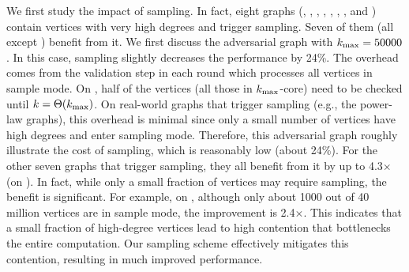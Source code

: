 We first study the impact of sampling. 
In fact, eight graphs (\TW{}, \EH{}, \SD{}, \CW{}, \HL{}, \HLs{}, \HPL{}, and \HCNS{}) contain vertices with very high degrees and trigger sampling. 
Seven of them (all except \HCNS{}) benefit from it. 
We first discuss the adversarial graph \HCNS{} with $k_{\max}=50000$. 
In this case, sampling slightly decreases the performance by 24\%. 
The overhead comes from the validation step in each round which processes all vertices in sample mode. 
On \HCNS{}, half of the vertices (all those in $k_{\max}$-core) need to be checked until $k=\Theta(k_{\max})$.  
On real-world graphs that trigger sampling (e.g., the power-law graphs), 
this overhead is minimal since only a small number of vertices have high degrees and enter sampling mode.
Therefore, this adversarial graph \HCNS{} roughly illustrate the cost of sampling, which is reasonably low (about 24\%). 
For the other seven graphs that trigger sampling, they all benefit from it by up to 4.3$\times$ (on \CW{}).
In fact, while only a small fraction of vertices may require sampling, the benefit is significant. 
For example, on \TW{}, although only about 1000 out of 40 million vertices are in sample mode, the improvement is 2.4$\times$. 
This indicates that a small fraction of high-degree vertices lead to high contention that bottlenecks the entire computation.
Our sampling scheme effectively mitigates this contention, resulting in much improved performance. 


